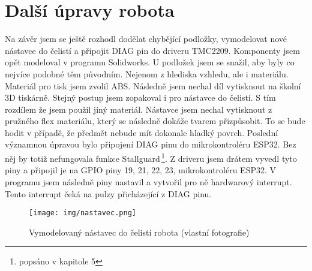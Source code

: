 \section{Další úpravy robota}Na závěr jsem se ještě rozhodl dodělat chybějící podložky, vymodelovat nové nástavce do čelistí a připojit DIAG pin do driveru TMC2209. Komponenty jsem opět modeloval v programu Solidworks. U podložek jsem se snažil, aby byly co nejvíce podobné těm původním. Nejenom z hlediska vzhledu, ale i materiálu. Materiál pro tisk jsem zvolil ABS. Následně jsem nechal díl vytisknout na školní 3D tiskárně. Stejný postup jsem zopakoval i pro nástavce do čelistí. S tím rozdílem že jsem použil jiný materiál. Nástavce jsem nechal vytisknout z pružného flex materiálu, který se následně dokáže tvarem přizpůsobit. To se bude hodit v případě, že předmět nebude mít dokonale hladký povrch. Poslední významnou úpravou bylo připojení DIAG pinu do mikrokontroléru ESP32. Bez něj by totiž nefungovala funkce Stallguard\,\footnote{popsáno v kapitole 5}. Z driveru jsem drátem vyvedl tyto piny a připojil je na GPIO piny 19, 21, 22, 23, mikrokontroléru ESP32. V programu jsem následně piny nastavil a vytvořil pro ně hardwarový interrupt. Tento interrupt čeká na pulzy přicházející z DIAG pinu. \cite{BIGTREETECH-TMC2209}


	\begin{figure}
		\begin{center}
			\texttt{[image: img/nastavec.png]}
			\caption{Vymodelovaný nástavec do čelistí robota (vlastní fotografie)}
			\label{fig:nastavec}
		\end{center}
		\vspace{-7mm}
	\end{figure}
